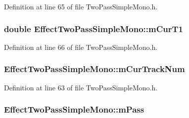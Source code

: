 Definition at line 65 of file Two\+Pass\+Simple\+Mono.\+h.

\subsubsection[{\texorpdfstring{m\+Cur\+T1}{mCurT1}}]{\setlength{\rightskip}{0pt plus 5cm}double Effect\+Two\+Pass\+Simple\+Mono\+::m\+Cur\+T1\hspace{0.3cm}{\ttfamily [protected]}}\hypertarget{class_effect_two_pass_simple_mono_ac26d0c8dbefeeb1fb5395e19d23644fb}{}\label{class_effect_two_pass_simple_mono_ac26d0c8dbefeeb1fb5395e19d23644fb}


Definition at line 66 of file Two\+Pass\+Simple\+Mono.\+h.

\subsubsection[{\texorpdfstring{m\+Cur\+Track\+Num}{mCurTrackNum}}]{ Effect\+Two\+Pass\+Simple\+Mono\+::m\+Cur\+Track\+Num\hspace{0.3cm}{\ttfamily [protected]}}\hypertarget{class_effect_two_pass_simple_mono_a770ffe6dace72bac2af23410212d42b8}{}\label{class_effect_two_pass_simple_mono_a770ffe6dace72bac2af23410212d42b8}


Definition at line 63 of file Two\+Pass\+Simple\+Mono.\+h.

\subsubsection[{\texorpdfstring{m\+Pass}{mPass}}]{ Effect\+Two\+Pass\+Simple\+Mono\+::m\+Pass\hspace{0.3cm}{\ttfamily [protected]}}\hypertarget{class_effect_two_pass_simple_mono_acacb66ebadd5b30fdec32ed28c150716}{}\label{class_effect_two_pass_simple_mono_acacb66ebadd5b30fdec32ed28c150716}


